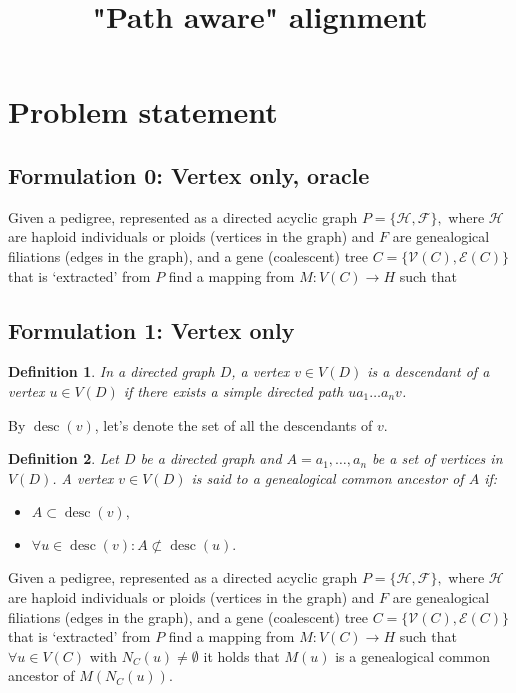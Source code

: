 \documentclass[14pt]{extarticle}
\DeclareMathOperator{\desc}{desc}
\newtheorem{definition}{Definition}
\begin{document}
	
	
\title{"Path aware" alignment}
\date{}

\section{Problem statement}
\subsection{Formulation 0: Vertex only, oracle} 
Given a pedigree, represented as a directed acyclic graph $P = \{\mathcal{H},\mathcal{F}\},$ where $\mathcal{H}$ are haploid individuals or ploids (vertices in the graph) and $F$ are genealogical filiations (edges in the graph), and a gene (coalescent) tree $C = \{\mathcal{V}(C),\mathcal{E}(C)\}$ that is `extracted' from $P$ find a mapping from $M:V(C) \rightarrow H$ such that       

\subsection{Formulation 1: Vertex only} 

\begin{definition}
	In a directed graph $D$, a vertex $v \in V(D)$ is a descendant of a vertex $u \in V(D)$ if there exists a simple directed path $ua_1 \ldots a_nv$.
\end{definition}

By $\desc(v)$, let's denote the set of all the descendants of $v$.

\begin{definition}
	
	Let $D$ be a directed graph and $A = a_1, \ldots, a_n$ be a set of vertices in $V(D)$. A vertex $v \in V(D)$ is said to a genealogical common ancestor of $A$ if:
	
	\begin{itemize}
		\item 
		$A \subset \desc(v),$
		\item 
		$\forall u \in \desc(v): A \not \subset \desc(u).$
	\end{itemize}
	
\end{definition}

Given a pedigree, represented as a directed acyclic graph $P = \{\mathcal{H},\mathcal{F}\},$ where $\mathcal{H}$ are haploid individuals or ploids (vertices in the graph) and $F$ are genealogical filiations (edges in the graph), and a gene (coalescent) tree $C = \{\mathcal{V}(C),\mathcal{E}(C)\}$ that is `extracted' from $P$ find a mapping from $M:V(C) \rightarrow H$ such that 
$\forall u \in V(C)$ with $N_C(u) \ne \emptyset$ it holds that $M(u)$ is a genealogical common ancestor of $M(N_C(u))$.
\end{document}
